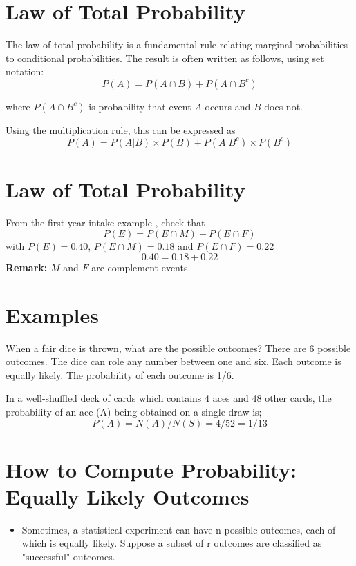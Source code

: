 \documentclass[]{report}
\begin{document}
{\section{Law of Total Probability}
The law of total probability is a fundamental rule relating marginal probabilities to conditional probabilities. The result is often written as follows, using set notation:
\[ P(A)  = P(A \cap B) + P(A \cap B^c) \]

where $P(A \cap B^c)$ is probability that event $A$ occurs and $B$ does not.\\ \bigskip


Using the multiplication rule, this can be expressed as
\[ P(A) = P(A | B)\times P(B) + P(A | B^{c})\times P(B^{c}) \]

{
\section{Law of Total Probability}
From the first year intake example , check that
\[ P(E)  = P(E \cap M) + P(E \cap F) \]
with $ P(E) = 0.40$, $ P(E \cap M) = 0.18$ and  $ P(E \cap F) = 0.22$
\[ 0.40  = 0.18 + 0.22 \]
\textbf{Remark:}  $M$ and $F$ are complement events.



\section*{Examples}
When a fair dice is thrown, what are the possible outcomes? There are 6 possible outcomes. The dice can role any number between one and six. Each outcome is equally likely. The probability of each outcome is 1/6.


In a well-shuffled deck of cards which contains 4 aces and 48 other cards, the probability of an ace (A)
being obtained on a single draw is;
\[ P(A)= N(A)/ N(S) = 4/52 = 1/13 \]


\section{How to Compute Probability: Equally Likely Outcomes}
\begin{itemize}
\item Sometimes, a statistical experiment can have n possible outcomes, each of which is equally likely. Suppose a subset of r outcomes are classified as "successful" outcomes.


\end{itemize}}}
\end{document}
